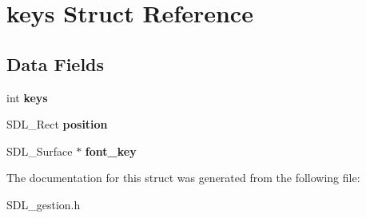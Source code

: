 \hypertarget{structkeys}{}\section{keys Struct Reference}
\label{structkeys}
\subsection*{Data Fields}
\begin{DoxyCompactItemize}
\item 
\mbox{\label{structkeys_a7559bc5bb2d0727a0be1ce90578d1052}} 
int {\bfseries keys}
\item 
\mbox{\label{structkeys_ae4cc6eb9699ee2a27c6cb5aac95db788}} 
S\+D\+L\+\_\+\+Rect {\bfseries position}
\item 
\mbox{\label{structkeys_a79d35a45748c103bf3158388c7c433f7}} 
S\+D\+L\+\_\+\+Surface $\ast$ {\bfseries font\+\_\+key}
\end{DoxyCompactItemize}


The documentation for this struct was generated from the following file\+:\begin{DoxyCompactItemize}
\item 
S\+D\+L\+\_\+gestion.\+h\end{DoxyCompactItemize}
